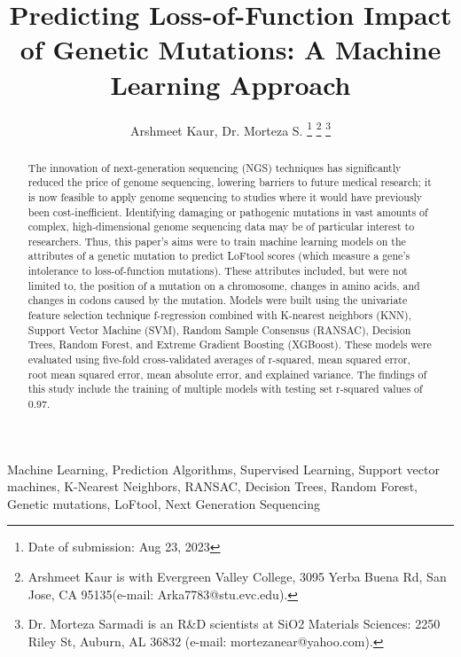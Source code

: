 \documentclass[journal,two side,web]{ieeecolor}
\begin{document}
\title{Predicting Loss-of-Function Impact of Genetic Mutations: A Machine Learning Approach}
\author{Arshmeet Kaur, Dr. Morteza S.
\thanks{Date of submission: Aug 23, 2023}
\thanks{Arshmeet Kaur is with Evergreen Valley College, 3095 Yerba Buena Rd, San Jose, CA 95135(e-mail: Arka7783@stu.evc.edu). }
\thanks{Dr. Morteza Sarmadi is an R&D scientists at SiO2 Materials Sciences: 2250 Riley St, Auburn, AL 36832 (e-mail: mortezanear@yahoo.com). }}

\maketitle

\begin{abstract}
The innovation of next-generation sequencing (NGS) techniques has significantly reduced the price of genome sequencing, lowering barriers to future medical research; it is now feasible to apply genome sequencing to studies where it would have previously been cost-inefficient. Identifying damaging or pathogenic mutations in vast amounts of complex, high-dimensional genome sequencing data may be of particular interest to researchers. Thus, this paper’s aims were to train machine learning models on the attributes of a genetic mutation to predict LoFtool scores (which measure a gene’s intolerance to loss-of-function mutations). These attributes included, but were not limited to, the position of a mutation on a chromosome, changes in amino acids, and changes in codons caused by the mutation. Models were built using the univariate feature selection technique f-regression combined with K-nearest neighbors (KNN), Support Vector Machine (SVM), Random Sample Consensus (RANSAC), Decision Trees, Random Forest, and Extreme Gradient Boosting (XGBoost). These models were evaluated using five-fold cross-validated averages of r-squared, mean squared error, root mean squared error, mean absolute error, and explained variance. The findings of this study include the training of multiple models with testing set r-squared values of 0.97. 
\end{abstract}

\begin{IEEEkeywords}
Machine Learning, Prediction Algorithms, Supervised Learning, Support vector machines, K-Nearest Neighbors, RANSAC, Decision Trees, Random Forest, Genetic mutations, LoFtool, Next Generation Sequencing
\end{IEEEkeywords}
\end{document}
